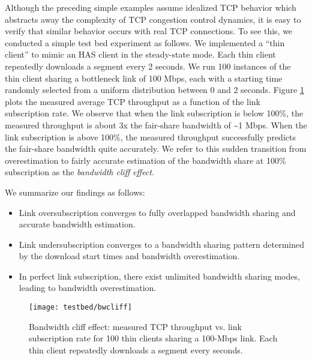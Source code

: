 \documentclass[conference]{IEEEtran}
\theoremstyle{plain}
\theoremstyle{definition}
\theoremstyle{plain}
\theoremstyle{plain}
\begin{document}
Although the preceding simple examples assume idealized TCP behavior
which abstracts away the complexity of TCP congestion control dynamics,
it is easy to verify that similar behavior occurs with real TCP connections.
To see this, we conducted a simple test bed experiment as follows.
We implemented a ``thin client'' to mimic an HAS client in the steady-state
mode. Each thin client repeatedly downloads a segment every 2 seconds.
We run 100 instances of the thin client sharing a bottleneck link
of 100 Mbps, each with a starting time randomly selected from a uniform
distribution between 0 and 2 seconds. Figure \ref{Flo:bwcliff} plots
the measured average TCP throughput as a function of the link subscription
rate. We observe that when the link subscription is below 100\%, the
measured throughput is about 3x the fair-share bandwidth of \textasciitilde{}1
Mbps. When the link subscription is above 100\%, the measured throughput
successfully predicts the fair-share bandwidth quite accurately. We
refer to this sudden transition from overestimation to fairly accurate
estimation of the bandwidth share at 100\% subscription as the \emph{bandwidth
cliff} \emph{effect}.

We summarize our findings as follows: 
\begin{itemize}
\item Link oversubscription converges to fully overlapped bandwidth sharing
and accurate bandwidth estimation. 
\item Link undersubscription converges to a bandwidth sharing pattern determined
by the download start times and bandwidth overestimation.
\item In perfect link subscription, there exist unlimited bandwidth sharing
modes, leading to bandwidth overestimation.
\end{itemize}
\begin{figure}
\begin{centering}
\texttt{[image: testbed/bwcliff]}\vspace{-0.1in}

\par\end{centering}

\caption{Bandwidth cliff effect: measured TCP throughput vs. link subscription
rate for 100 thin clients sharing a 100-Mbps link. Each thin client
repeatedly downloads a segment every  seconds.}


\label{Flo:bwcliff} \vspace{-0.05in}
\end{figure}
\end{document}

